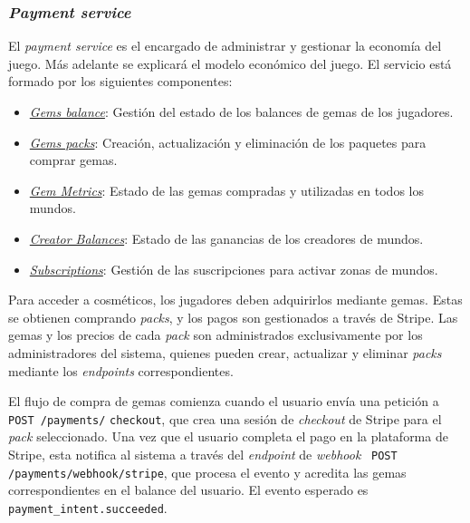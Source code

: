 \subsubsection{\textit{Payment service}}
\label{sec:payment-service}

El \textit{payment service} es el encargado de administrar y gestionar la economía del juego. Más adelante se explicará
el modelo económico del juego. El servicio está formado por los siguientes componentes:
\vspace{0.25cm}

\begin{itemize}
  \item \underline{\textit{Gems balance}}: Gestión del estado de los balances de gemas de los jugadores.
  \item \underline{\textit{Gems packs}}: Creación, actualización y eliminación de los paquetes para comprar gemas.
  \item \underline{\textit{Gem Metrics}}: Estado de las gemas compradas y utilizadas en todos los mundos.
  \item \underline{\textit{Creator Balances}}: Estado de las ganancias de los creadores de mundos.
  \item \underline{\textit{Subscriptions}}: Gestión de las suscripciones para activar zonas de mundos.
\end{itemize}

Para acceder a cosméticos, los jugadores deben adquirirlos mediante gemas. Estas se obtienen comprando \textit{packs}, 
y los pagos son gestionados a través de Stripe. Las gemas y los precios de cada \textit{pack} son administrados exclusivamente 
por los administradores del sistema, quienes pueden crear, actualizar y eliminar \textit{packs} mediante los \textit{endpoints} 
correspondientes.
\vspace{0.25cm}

El flujo de compra de gemas comienza cuando el usuario envía una petición a \texttt{POST /payments/} \texttt{checkout},
que crea una sesión de \textit{checkout} de Stripe para el \textit{pack} seleccionado. Una vez que el usuario
completa el pago en la plataforma de Stripe, esta notifica al sistema a través del \textit{endpoint} de
\textit{webhook} \, \texttt{POST /payments/webhook/stripe}, que procesa el evento y acredita las gemas
correspondientes en el balance del usuario. El evento esperado es \texttt{payment\_intent.succeeded}.

\vspace{0.25cm}

